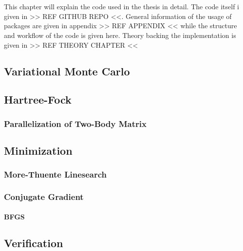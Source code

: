 \chapter{\label{chapter:5}}
    This chapter will explain the code used in the thesis in detail. The code
    itself i given in >> REF GITHUB REPO <<. General information of the usage
    of packages are given in appendix >> REF APPENDIX << while the structure
    and workflow of the code is given here. Theory backing the implementation
    is given in >> REF THEORY CHAPTER <<

\section{Variational Monte Carlo}
\section{Hartree-Fock}
\subsection{Parallelization of Two-Body Matrix}
\section{Minimization}
\subsection{More-Thuente Linesearch}
\subsection{Conjugate Gradient}
\subsubsection{BFGS}
\section{Verification\label{sec:verification}}
